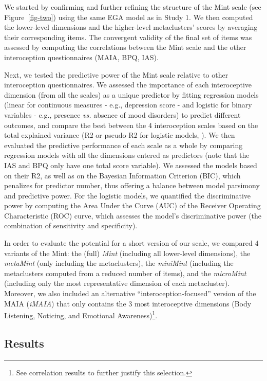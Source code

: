 \documentclass[
  jou,
  floatsintext,
  longtable,
  nolmodern,
  notxfonts,
  notimes,
  colorlinks=true,linkcolor=blue,citecolor=blue,urlcolor=blue]{apa7}
\begin{document}
We started by confirming and further refining the structure of the Mint
scale (see Figure~\ref{fig-two}) using the same EGA model as in Study 1.
We then computed the lower-level dimensions and the higher-level
metaclusters' scores by averaging their corresponding items. The
convergent validity of the final set of items was assessed by computing
the correlations between the Mint scale and the other interoception
questionnaires (MAIA, BPQ, IAS).

Next, we tested the predictive power of the Mint scale relative to other
interoception questionnaires. We assessed the importance of each
interoceptive dimension (from all the scales) as a unique predictor by
fitting regression models (linear for continuous measures - e.g.,
depression score - and logistic for binary variables - e.g., presence
\emph{vs.} absence of mood disorders) to predict different outcomes, and
compare the best between the 4 interoception scales based on the total
explained variance (R2 or pseudo-R2 for logistic models,
). We then
evaluated the predictive performance of each scale as a whole by
comparing regression models with all the dimensions entered as
predictors (note that the IAS and BPQ only have one total score
variable). We assessed the models based on their R2, as well as on the
Bayesian Information Criterion (BIC), which penalizes for predictor
number, thus offering a balance between model parsimony and predictive
power. For the logistic models, we quantified the discriminative power
by computing the Area Under the Curve (AUC) of the Receiver Operating
Characteristic (ROC) curve, which assesses the model's discriminative
power (the combination of sensitivity and specificity).

In order to evaluate the potential for a short version of our scale, we
compared 4 variants of the Mint: the (full) \emph{Mint} (including all
lower-level dimensions), the \emph{metaMint} (only including the
metaclusters), the \emph{miniMint} (including the metaclusters computed
from a reduced number of items), and the \emph{microMint} (including
only the most representative dimension of each metacluster). Moreover,
we also included an alternative ``interoception-focused'' version of the
MAIA (\emph{iMAIA}) that only contains the 3 most interoceptive
dimensions (Body Listening, Noticing, and Emotional
Awareness)\footnote{See correlation results to further justify this
  selection.}.

\subsection{Results}\label{results-1}
\end{document}
